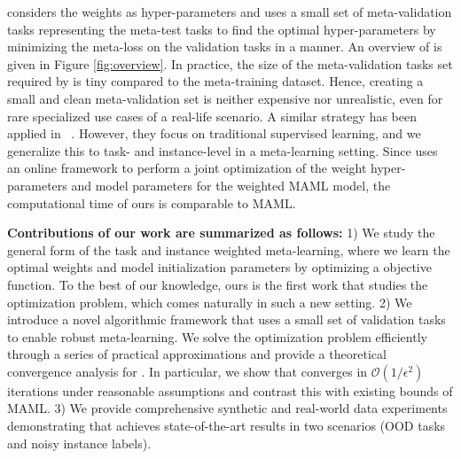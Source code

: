 

\sysname{} considers the weights as hyper-parameters and uses a small set of meta-validation tasks representing the meta-test tasks to find the optimal hyper-parameters by minimizing the meta-loss on the validation tasks in a \textbf{\biopt{}} manner.  An overview of \sysname{} is given in Figure \ref{fig:overview}. In practice, the size of the meta-validation tasks set required by \sysname{} is tiny compared to the meta-training dataset. Hence, creating a  small and clean meta-validation set is neither expensive nor unrealistic, even for rare specialized use cases of a real-life scenario. A similar strategy has been applied in ~\citep{ren2018learning,shu2019meta,killamsetty2020glister}. However, they focus on traditional supervised learning, and we generalize this to task- and instance-level in a meta-learning setting. Since \sysname{} uses an online framework to perform a joint optimization of the weight hyper-parameters and model parameters for the weighted MAML model, the computational time of ours is comparable to MAML.

\noindent \textbf{Contributions of our work are summarized as follows:} 1) We study the general form of the task and instance weighted meta-learning, where we learn the optimal weights and model initialization parameters by optimizing a \textit{\biopt{}} objective function. To the best of our knowledge, ours is the first work that studies the \textit{\biopt{}} optimization problem, which comes naturally in such a new setting. 2) We introduce a novel algorithmic framework \sysname{} that uses a small set of validation tasks to enable robust meta-learning. We solve the \emph{\biopt{}} optimization problem efficiently through a series of practical approximations and provide a theoretical convergence analysis for \sysname{}. In particular, we show that \sysname{} converges in $\mathcal{O}(1/\epsilon^2)$ iterations under reasonable assumptions and contrast this with existing bounds of MAML. 3) We provide comprehensive synthetic and real-world data experiments demonstrating that \sysname{} achieves state-of-the-art results in two scenarios (OOD tasks and noisy instance labels).

